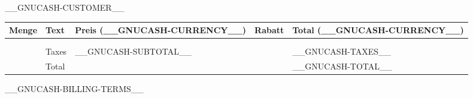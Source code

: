 \documentclass[DIN, pagenumber=false, parskip=half,%
               fromalign=left, fromphone=true,%
               fromemail=true, fromurl=false, %
               fromlogo=true, fromrule=false]{scrlttr2}
\newcommand{\amp}{&}
\newcommand{\printQuantity}[1]{
  \gclgetline{Quantity}{#1}%
  \ifthenelse{\equal{\gclgetline{Action}{#1}}{Hours}}{h}{}
  \ifthenelse{\equal{\gclgetline{Action}{#1}}{Material}}{Stk.}{}
}
\newcommand{\printDiscount}[1]{
  \gclgetline{Disc}{#1}%
  \ifthenelse{\equal{\gclgetline{DiscType}{#1}}{PERCENT}}{\%}{}
  \ifthenelse{\equal{\gclgetline{DiscType}{#1}}{VALUE}}{__GNUCASH-CURRENCY__}{}
}
\newcommand{\printline}[5]{
#1\amp#2\amp#3\amp#4\amp#5\\
}
\newcounter{i}
\newcommand{\printtab}[1]{%
  \setcounter{i}{0}
  \whiledo {\value{i} < #1}{
    \printline{\printQuantity{\arabic{i}}}
              {\gclgetline{Description}{\arabic{i}}}
              {\hfill\gclgetline{UnitPrice}{\arabic{i}}}
              {\printDiscount{\arabic{i}}}
              {\hfill\gclgetline{Subtotal}{\arabic{i}}}
    \stepcounter{i}
  }
}
\begin{document}
\begin{letter}{__GNUCASH-CUSTOMER__}
\opening{}

\fontsize{10pt}{1em}\selectfont
\begin{tabularx}{\linewidth}{lXlll}
  Menge & Text & Preis (__GNUCASH-CURRENCY__) & Rabatt & Total (__GNUCASH-CURRENCY__) \\\toprule
  \printtab{\csuse{gclinvoicelines}}\\[-2ex]
  \midrule
  &Taxes&\hfill__GNUCASH-SUBTOTAL__&&\hfill__GNUCASH-TAXES__\\
  &\multicolumn{3}{l}{Total}&\hfill__GNUCASH-TOTAL__\\
  \bottomrule
\end{tabularx}

__GNUCASH-BILLING-TERMS__

\closing{}

\end{letter}
\end{document}
